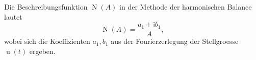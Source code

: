 Die Beschreibungsfunktion $\operatorname{N}(A)$ in der Methode der harmonischen Balance lautet
$$\operatorname{N}(A) = \frac{a_{1} + \mathsf{i} b_{1}}{A},$$ 
wobei sich die Koeffizienten $a_{1}, b_{1}$ aus der Fourierzerlegung der Stellgroesse $\operatorname{u}(t)$ ergeben.
